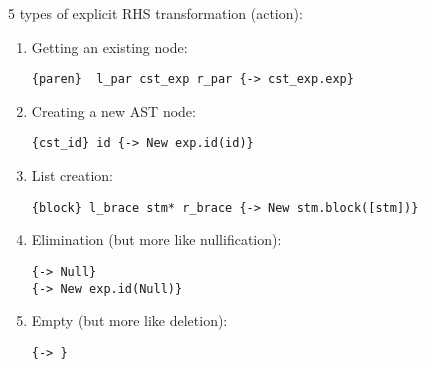 \begin{slide*}
5 types of explicit RHS transformation (action):

\begin{enumerate}

\item Getting an existing node:

\begin{scriptsize}
\begin{verbatim}
{paren}  l_par cst_exp r_par {-> cst_exp.exp}
\end{verbatim}
\end{scriptsize}

\item Creating a new AST node:

\begin{scriptsize}
\begin{verbatim}
{cst_id} id {-> New exp.id(id)}
\end{verbatim}
\end{scriptsize}

\item List creation:

\begin{scriptsize}
\begin{verbatim}
{block} l_brace stm* r_brace {-> New stm.block([stm])}
\end{verbatim}
\end{scriptsize}

\item Elimination (but more like nullification):

\begin{scriptsize}
\begin{verbatim}
{-> Null}
{-> New exp.id(Null)}
\end{verbatim}
\end{scriptsize}

\item Empty (but more like deletion):

\begin{scriptsize}
\begin{verbatim}
{-> }
\end{verbatim}
\end{scriptsize}
\end{enumerate}

\vfil
\end{slide*}

